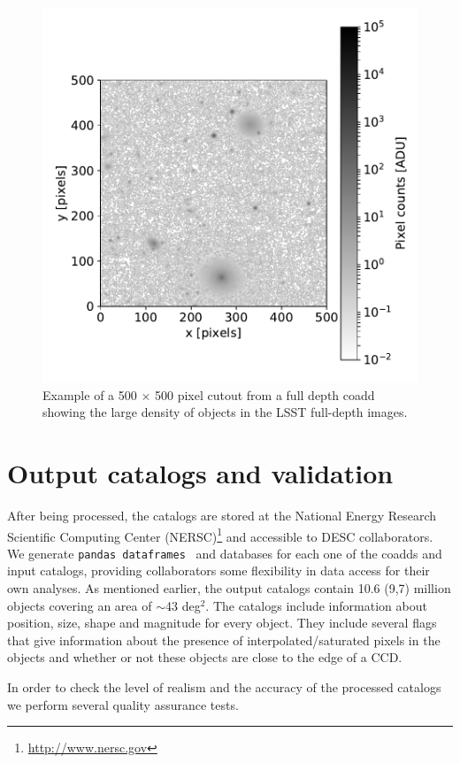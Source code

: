 \documentclass[twocolumn]{aastex62}
\begin{document}
\begin{figure}
\centering
\includegraphics[width=0.9\columnwidth]{sample_coadd_DC1.pdf}
\caption{Example of a 500 $\times$ 500 pixel cutout from a full depth coadd showing the large density of objects in the LSST full-depth images.}
\label{fig:coadd_example}
\end{figure}

\section{Output catalogs and validation}
\label{sec:catalogs}

After being processed, the catalogs are stored at the National Energy Research Scientific Computing Center (NERSC)\footnote{\url{http://www.nersc.gov}} and accessible to DESC collaborators. We generate \texttt{pandas
dataframes}~\citep{mckinneypandas} and databases for each one of the coadds and input catalogs, providing collaborators some flexibility in data access for their own analyses. As mentioned earlier, the output catalogs contain 10.6 (9,7) million objects covering an area
of $\sim$43 deg$^{2}$. The catalogs include information about position, size, shape and magnitude for every object. They include several flags that give information about the presence of interpolated/saturated pixels in the objects and whether or not these objects are close to the edge of a CCD.

In order to check the level of realism and the accuracy of the processed catalogs we perform several quality assurance tests.
\end{document}
